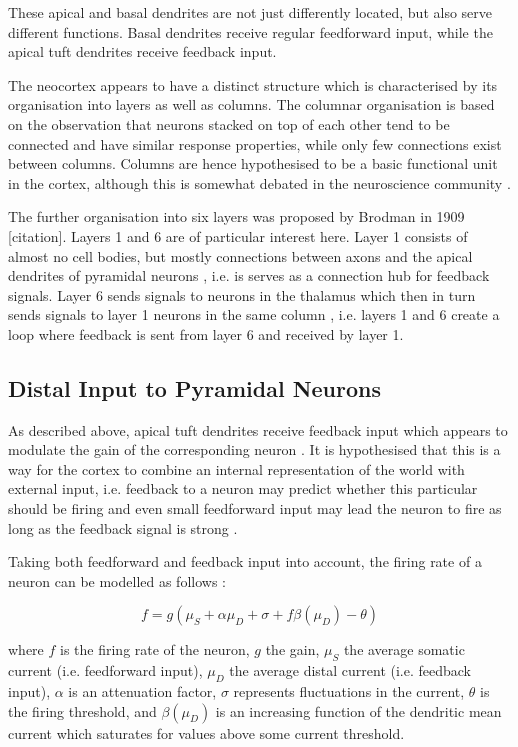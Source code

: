 \documentclass{article}
\begin{document}
These apical and basal dendrites are not just differently located, but also serve different functions. Basal dendrites receive regular feedforward input, while the apical tuft dendrites receive feedback input. 

The neocortex appears to have a distinct structure which is characterised by its organisation into layers as well as columns. The columnar organisation is based on the observation that neurons stacked on top of each other tend to be connected and have similar response properties, while only few connections exist between columns. Columns are hence hypothesised to be a basic functional unit in the cortex, although this is somewhat debated in the neuroscience community \cite{goodhill2002}.

The further organisation into six layers was proposed by Brodman in 1909 [citation]. Layers 1 and 6 are of particular interest here. Layer 1 consists of almost no cell bodies, but mostly connections between axons and the apical dendrites of pyramidal neurons \cite{shipp2007}, i.e. is serves as a connection hub for feedback signals. Layer 6 sends signals to neurons in the thalamus which then in turn sends signals to layer 1 neurons in the same column \cite{shipp2007}, i.e. layers 1 and 6 create a loop where feedback is sent from layer 6 and received by layer 1.  
\subsection{Distal Input to Pyramidal Neurons}
\label{cellmech}
As described above, apical tuft dendrites receive feedback input which appears to modulate the gain of the corresponding neuron \cite{larkum2004}. It is hypothesised that this is a way for the cortex to combine an internal representation of the world with external input, i.e. feedback to a neuron may predict whether this particular should be firing and even small feedforward input may lead the neuron to fire as long as the feedback signal is strong \cite{larkum2013cellular}. 

Taking both feedforward and feedback input into account, the firing rate of a neuron can be modelled as follows \cite{larkum2004}:

\begin{equation} 
	\label{eq:neurogain}
	f = g(\mu_S + \alpha \mu_D + \sigma + f\beta(\mu_D)-\theta)
\end{equation}

where $f$ is the firing rate of the neuron, $g$ the gain, $\mu_S$ the average somatic current (i.e. feedforward input), $\mu_D$ the average distal current (i.e. feedback input), $\alpha$ is an attenuation factor, $\sigma$ represents fluctuations in the current, $\theta$ is the firing threshold, and $\beta(\mu_D)$ is an increasing function of the dendritic mean current which saturates for values above some current threshold.  
\end{document}

